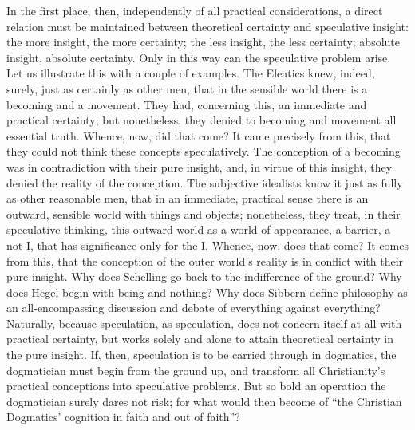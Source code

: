\documentclass[12pt]{book}
\begin{document}
In the first place, then, independently of all practical considerations, a direct relation must be maintained between theoretical certainty and speculative insight: the more insight, the more certainty; the less insight, the less certainty; absolute insight, absolute certainty. Only in this way can the speculative problem arise. Let us illustrate this with a couple of examples. The Eleatics knew, indeed, surely, just as certainly as other men, that in the sensible world there is a becoming and a movement. They had, concerning this, an immediate and practical certainty; but nonetheless, they denied to becoming and movement all essential truth. Whence, now, did that come? It came precisely from this, that they could not think these concepts speculatively. The conception of a becoming was
in contradiction with their pure insight, and, in virtue of this insight, they denied the reality of the conception. The subjective idealists know it just as fully as other reasonable men, that in an immediate, practical sense there is an outward, sensible world with things and objects; nonetheless, they treat, in their speculative thinking, this outward world as a world of appearance, a barrier, a not-I, that has significance only for the I. Whence, now, does that come? It comes from this, that the conception of the outer world's reality is in conflict with their pure insight. Why does Schelling go back to the indifference of the ground? Why does Hegel begin with being and nothing? Why does Sibbern define philosophy as an all-encompassing discussion and debate of everything against everything? Naturally, because speculation, as speculation, does not concern itself at all with practical certainty, but works solely and alone to attain theoretical certainty in the pure insight. If, then, speculation is to be carried through in dogmatics, the dogmatician must begin from the ground up, and transform all Christianity's practical conceptions into speculative problems. But so bold an operation the dogmatician surely dares not risk; for what would then become of ``the Christian Dogmatics' cognition in faith and out of faith''?
\end{document}
